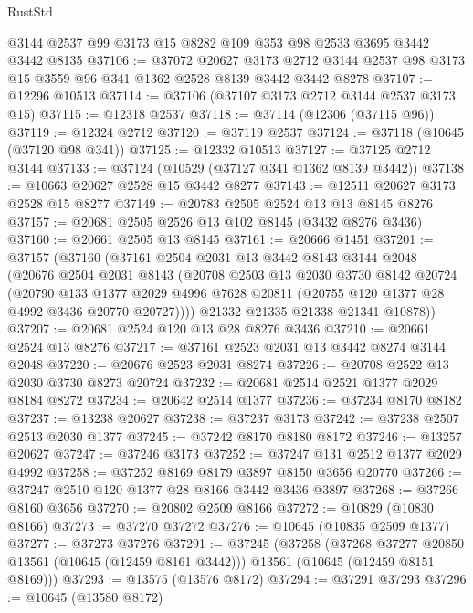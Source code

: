\begin{lexlean}{RustStd}
\begin{coremodule}
    @3144
    @2537
    @99
    @3173
    @15
    @8282
    @109
    @353
    @98
    @2533
    @3695
    @3442
    @3442
    @8135
@37106 := @37072
    @20627
    @3173
    @2712
    @3144
    @2537
    @98
    @3173
    @15
    @3559
    @96
    @341
    @1362
    @2528
    @8139
    @3442
    @3442
    @8278
@37107 := @12296 @10513
@37114 := @37106 (@37107 @3173 @2712 @3144 @2537 @3173 @15)
@37115 := @12318 @2537
@37118 := @37114 (@12306 (@37115 @96))
@37119 := @12324 @2712
@37120 := @37119 @2537
@37124 := @37118 (@10645 (@37120 @98 @341))
@37125 := @12332 @10513
@37127 := @37125 @2712 @3144
@37133 := @37124 (@10529 (@37127 @341 @1362 @8139 @3442))
@37138 := @10663 @20627 @2528 @15 @3442 @8277
@37143 := @12511 @20627 @3173 @2528 @15 @8277
@37149 := @20783 @2505 @2524 @13 @13 @8145 @8276
@37157 := @20681 @2505 @2526 @13 @102 @8145 (@3432 @8276 @3436)
@37160 := @20661 @2505 @13 @8145
@37161 := @20666 @1451
@37201 := @37157
    (@37160
      (@37161
        @2504
        @2031
        @13
        @3442
        @8143
        @3144
        @2048
        (@20676
          @2504
          @2031
          @8143
          (@20708
            @2503
            @13
            @2030
            @3730
            @8142
            @20724
            (@20790
              @133
              @1377
              @2029
              @4996
              @7628
              @20811
              (@20755 @120 @1377 @28 @4992 @3436 @20770 @20727))))
        @21332
        @21335
        @21338
        @21341
        @10878))
@37207 := @20681 @2524 @120 @13 @28 @8276 @3436
@37210 := @20661 @2524 @13 @8276
@37217 := @37161 @2523 @2031 @13 @3442 @8274 @3144 @2048
@37220 := @20676 @2523 @2031 @8274
@37226 := @20708 @2522 @13 @2030 @3730 @8273 @20724
@37232 := @20681 @2514 @2521 @1377 @2029 @8184 @8272
@37234 := @20642 @2514 @1377
@37236 := @37234 @8170 @8182
@37237 := @13238 @20627
@37238 := @37237 @3173
@37242 := @37238 @2507 @2513 @2030 @1377
@37245 := @37242 @8170 @8180 @8172
@37246 := @13257 @20627
@37247 := @37246 @3173
@37252 := @37247 @131 @2512 @1377 @2029 @4992
@37258 := @37252 @8169 @8179 @3897 @8150 @3656 @20770
@37266 := @37247 @2510 @120 @1377 @28 @8166 @3442 @3436 @3897
@37268 := @37266 @8160 @3656
@37270 := @20802 @2509 @8166
@37272 := @10829 (@10830 @8166)
@37273 := @37270 @37272
@37276 := @10645 (@10835 @2509 @1377)
@37277 := @37273 @37276
@37291 := @37245
    (@37258
      (@37268 @37277 @20850 @13561 (@10645 (@12459 @8161 @3442)))
      @13561
      (@10645 (@12459 @8151 @8169)))
@37293 := @13575 (@13576 @8172)
@37294 := @37291 @37293
@37296 := @10645 (@13580 @8172)

\end{coremodule}
\end{lexlean}
